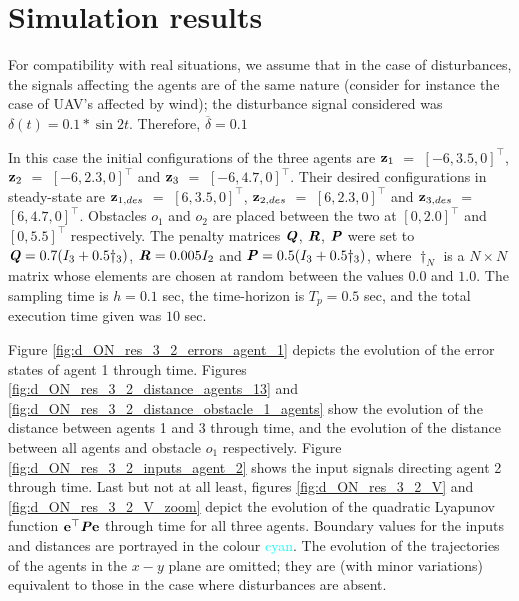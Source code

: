 \section{Simulation results}

For compatibility with real situations, we assume that in the case
of disturbances, the signals affecting the agents are of the same nature
(consider for instance the case of UAV's affected by wind); the disturbance
signal considered was $\delta(t) = 0.1 * \sin 2t$. Therefore,
$\overline{\delta} = 0.1$





In this case the initial configurations of the three agents are
$\bm{\mathbf{z}}_1$ $=$ $[-6, 3.5, 0]^{\top}$,
$\bm{\mathbf{z}}_2$ $=$ $[-6, 2.3, 0]^{\top}$ and
$\bm{\mathbf{z}}_3$ $=$ $[-6, 4.7, 0]^{\top}$.
Their desired configurations in steady-state are
$\bm{\mathbf{z}}_{1,des}$ $=$ $[6, 3.5, 0]^{\top}$,
$\bm{\mathbf{z}}_{2,des}$ $=$ $[6, 2.3, 0]^{\top}$ and
$\bm{\mathbf{z}}_{3,des}$ $=$ $[6, 4.7, 0]^{\top}$.
Obstacles $o_1$ and $o_2$ are placed between the two at $[0, 2.0]^{\top}$
and $[0, 5.5]^{\top}$ respectively. The penalty
matrices $\bm{\mathit{Q}}$, $\bm{\mathit{R}}$, $\bm{\mathit{P}}$ were set to
$\bm{\mathit{Q}} = 0.7 (I_3 + 0.5\dagger_3)$, $\bm{\mathit{R}} = 0.005 I_2$ and
$\bm{\mathit{P}} = 0.5 (I_3 + 0.5\dagger_3)$, where $\dagger_N$ is a $N \times N$
matrix whose elements are chosen at random between the values $0.0$ and $1.0$.
The sampling time is $h = 0.1$ sec, the time-horizon is $T_p = 0.5$ sec, and
the total execution time given was $10$ sec.

Figure \eqref{fig:d_ON_res_3_2_errors_agent_1} depicts the evolution of the
error states of agent 1 through time.
Figures \eqref{fig:d_ON_res_3_2_distance_agents_13} and
\eqref{fig:d_ON_res_3_2_distance_obstacle_1_agents} show the evolution of the
distance between agents 1 and 3 through time, and the evolution of the
distance between all agents and obstacle $o_1$ respectively.
Figure \eqref{fig:d_ON_res_3_2_inputs_agent_2} shows the input signals
directing agent 2 through time. Last but not at all least, figures
\eqref{fig:d_ON_res_3_2_V} and \eqref{fig:d_ON_res_3_2_V_zoom} depict
the evolution of the quadratic Lyapunov function
$\bm{\mathbf{e}}^{\top} \bm{\mathit{P}} \bm{\mathbf{e}}$ through time for all three agents.
Boundary values for the inputs and distances are portrayed in the colour
\textcolor{cyan}{cyan}. The evolution of the trajectories of the agents in the
$x-y$ plane are omitted; they are (with minor variations) equivalent to those
in the case where disturbances are absent.


